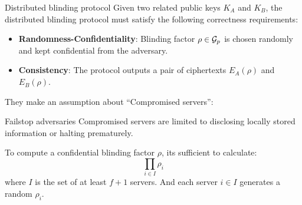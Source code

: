 \documentclass[10pt]{beamer}
\begin{document}
\begin{frame}[allowframebreaks]{Distributed blinding protocol}
  Given two related public keys $K_A$ and $K_B$, the distributed blinding protocol must satisfy the following correctness requirements:
  \begin{itemize}
  \item \textbf{Randomness-Confidentiality}: Blinding factor $\rho\in{\mathcal{G}}_p$ is chosen randomly and kept confidential from the adversary.
  \item \textbf{Consistency}: The protocol outputs a pair of ciphertexts $E_A(\rho)$ and $E_B(\rho)$.
  \end{itemize}

  They make an assumption about ``Compromised servers'':
  \begin{alertblock}{Failstop adversaries}
    Compromised servers are limited to disclosing locally stored information or halting prematurely.
  \end{alertblock}
  
  \framebreak

  To compute a confidential blinding factor $\rho$, its sufficient to calculate:
  \begin{equation*}
    \prod_{i\in I}\rho_i
  \end{equation*}
  where $I$ is the set of at least $f+1$ servers. And each server $i\in I$ generates a random $\rho_i$.
\end{frame}
\end{document}
